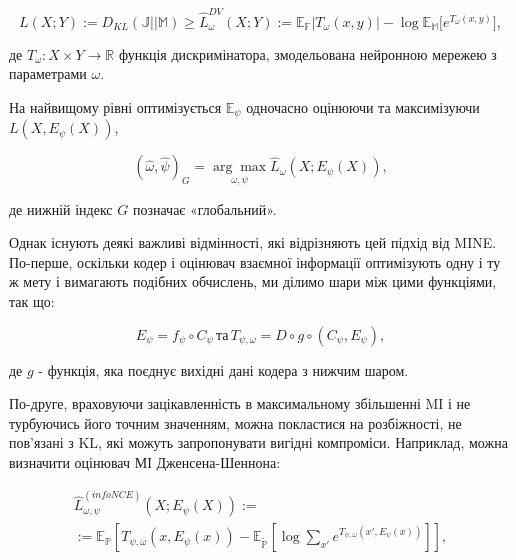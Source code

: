 \begin{equation}\label{eq:dv}
L(X; Y) := D_{KL}(\mathbb{J}||\mathbb{M}) \ge \hat{L}_{\omega}^{DV}(X;Y):=\mathbb{E}_{\mathbb{F}}|T_{\omega}(x,y)| - \log{\mathbb{E}_{\mathbb{M}}[e^{T_{\omega}(x,y)}}],
\end{equation}

\noindent де $T_{\omega}: X \times Y \rightarrow \mathbb{R}$ функція дискримінатора, змодельована нейронною\newline 
\hspace*{15pt}мережею з параметрами $\omega$.

\vspace{1.5em}

На найвищому рівні оптимізується $\mathbb{E_{\psi}}$ одночасно оцінюючи та максимізуючи $L(X, E_{\psi}(X))$,

\begin{equation}\label{eq:e_psi_opt}
(\hat{\omega}, \hat{\psi})_{G} = \underset{\omega,\psi}{\arg\max}\hat{L}_{\omega}(X;E_{\psi}(X)),
\end{equation}


\noindent де нижній індекс $G$ позначає «глобальний». 

\vspace{1.5em}

Однак існують деякі важливі відмінності, які відрізняють цей підхід від MINE. По-перше, оскільки кодер і оцінювач взаємної інформації оптимізують одну і ту ж мету і вимагають подібних обчислень, ми ділимо шари між цими функціями, так що: 

\begin{equation}\label{eq:hz}
	E_{\psi} = f_{\psi} \circ C_{\psi} \, \text{та} \, T_{\psi, \omega} = D \circ g \circ (C_{\psi}, E_{\psi}), 
\end{equation}

\noindent де $g$ - функція, яка поєднує вихідні дані кодера з нижчим шаром.

\vspace{1.5em}

По-друге, враховуючи зацікавленність в максимальному збільшенні MI і не турбуючись його точним значенням, можна покластися на розбіжності, не пов’язані з KL, які можуть запропонувати вигідні компроміси. Наприклад, можна визначити оцінювач МІ Дженсена-Шеннона:

\begin{equation}\label{eq:mi}
\begin{aligned}
\hat{L}_{\omega, \psi}^{(infoNCE)}(X;E_{\psi}(X)) := \\ := \mathbb{E_{P}}\left[T_{\psi,\omega}(x, E_{\psi}(x))  - \mathbb{E_{\tilde{P}}}\left[\log{\sum_{x'}{e^{T_{\psi, \omega}(x',E_{\psi}(x))}}}\right]\right],
\end{aligned}
\end{equation}

